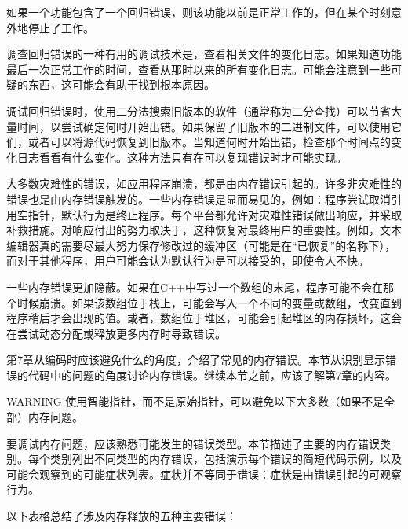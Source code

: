 如果一个功能包含了一个回归错误，则该功能以前是正常工作的，但在某个时刻意外地停止了工作。

调查回归错误的一种有用的调试技术是，查看相关文件的变化日志。如果知道功能最后一次正常工作的时间，查看从那时以来的所有变化日志。可能会注意到一些可疑的东西，这可能会有助于找到根本原因。

调试回归错误时，使用二分法搜索旧版本的软件（通常称为二分查找）可以节省大量时间，以尝试确定何时开始出错。如果保留了旧版本的二进制文件，可以使用它们，或者可以将源代码恢复到旧版本。当知道何时开始出错，检查那个时间点的变化日志看看有什么变化。这种方法只有在可以复现错误时才可能实现。


大多数灾难性的错误，如应用程序崩溃，都是由内存错误引起的。许多非灾难性的错误也是由内存错误触发的。一些内存错误是显而易见的，例如：程序尝试取消引用空指针，默认行为是终止程序。每个平台都允许对灾难性错误做出响应，并采取补救措施。对响应付出的努力取决于，这种恢复对最终用户的重要性。例如，文本编辑器真的需要尽最大努力保存修改过的缓冲区（可能是在“已恢复”的名称下），而对于其他程序，用户可能会认为默认行为是可以接受的，即使令人不快。

一些内存错误更加隐蔽。如果在C++中写过一个数组的末尾，程序可能不会在那个时候崩溃。如果该数组位于栈上，可能会写入一个不同的变量或数组，改变直到程序稍后才会出现的值。或者，数组位于堆区，可能会引起堆区的内存损坏，这会在尝试动态分配或释放更多内存时导致错误。

第7章从编码时应该避免什么的角度，介绍了常见的内存错误。本节从识别显示错误的代码中的问题的角度讨论内存错误。继续本节之前，应该了解第7章的内容。

\begin{myWarning}{WARNING}
使用智能指针，而不是原始指针，可以避免以下大多数（如果不是全部）内存问题。
\end{myWarning}


要调试内存问题，应该熟悉可能发生的错误类型。本节描述了主要的内存错误类别。每个类别列出不同类型的内存错误，包括演示每个错误的简短代码示例，以及可能会观察到的可能症状列表。症状并不等同于错误：症状是由错误引起的可观察行为。


以下表格总结了涉及内存释放的五种主要错误：


